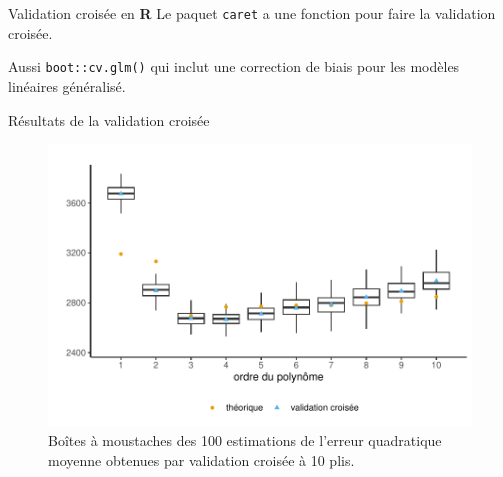 \documentclass[
  ignorenonframetext,
]{beamer}
\newenvironment{Shaded}{\begin{snugshade}}{\end{snugshade}}
\newcommand{\AttributeTok}[1]{\textcolor[rgb]{0.40,0.45,0.13}{#1}}
\newcommand{\CommentTok}[1]{\textcolor[rgb]{0.37,0.37,0.37}{#1}}
\newcommand{\DecValTok}[1]{\textcolor[rgb]{0.68,0.00,0.00}{#1}}
\newcommand{\FunctionTok}[1]{\textcolor[rgb]{0.28,0.35,0.67}{#1}}
\newcommand{\NormalTok}[1]{\textcolor[rgb]{0.00,0.23,0.31}{#1}}
\newcommand{\OtherTok}[1]{\textcolor[rgb]{0.00,0.23,0.31}{#1}}
\newcommand{\SpecialCharTok}[1]{\textcolor[rgb]{0.37,0.37,0.37}{#1}}
\newcommand{\StringTok}[1]{\textcolor[rgb]{0.13,0.47,0.30}{#1}}
\begin{document}
\begin{frame}[fragile]{Validation croisée en \textbf{R}}
\protect\hypertarget{validation-croisuxe9e-en-r}{}
Le paquet \texttt{caret} a une fonction pour faire la validation
croisée.

\begin{Shaded}
\end{Shaded}

Aussi \texttt{boot::cv.glm()} qui inclut une correction de biais pour
les modèles linéaires généralisé.
\end{frame}

\begin{frame}{Résultats de la validation croisée}
\protect\hypertarget{ruxe9sultats-de-la-validation-croisuxe9e}{}
\begin{figure}

{\centering \includegraphics[width=1\textwidth,height=\textheight]{MATH60602-diapos4_files/figure-beamer/fig-plotcv-1.pdf}

}

\caption{\label{fig-plotcv}Boîtes à moustaches des 100 estimations de
l'erreur quadratique moyenne obtenues par validation croisée à 10 plis.}

\end{figure}
\end{frame}
\end{document}
